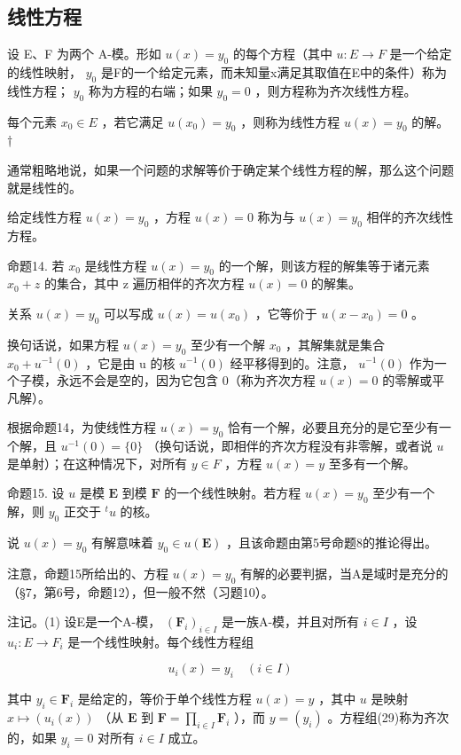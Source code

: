 \subsection{线性方程}

设 E、F 为两个 A-模。形如 \(u(x) = y_{0}\) 的每个方程（其中 \(u: E \to F\) 是一个给定的线性映射， \(y_{0}\) 是F的一个给定元素，而未知量x满足其取值在E中的条件）称为线性方程； \(y_{0}\) 称为方程的右端；如果 \(y_{0} = 0\) ，则方程称为齐次线性方程。

每个元素 \(x_{0} \in E\) ，若它满足 \(u(x_{0}) = y_{0}\) ，则称为线性方程 \(u(x) = y_{0}\) 的解。†

通常粗略地说，如果一个问题的求解等价于确定某个线性方程的解，那么这个问题就是线性的。

给定线性方程 \(u(x) = y_{0}\) ，方程 \(u(x) = 0\) 称为与 \(u(x) = y_{0}\) 相伴的齐次线性方程。

命题14. 若 \(x_{0}\) 是线性方程 \(u(x) = y_{0}\) 的一个解，则该方程的解集等于诸元素 \(x_{0} + z\) 的集合，其中 z 遍历相伴的齐次方程 \(u(x) = 0\) 的解集。

关系 \(u(x) = y_0\) 可以写成 \(u(x) = u(x_0)\) ，它等价于 \(u(x - x_0) = 0\) 。

换句话说，如果方程 \(u(x) = y_{0}\) 至少有一个解 \(x_{0}\) ，其解集就是集合 \(x_{0} + u^{-1}(0)\) ，它是由 u 的核 \(u^{-1}(0)\) 经平移得到的。注意， \(u^{-1}(0)\) 作为一个子模，永远不会是空的，因为它包含 0（称为齐次方程 \(u(x) = 0\) 的零解或平凡解）。

根据命题14，为使线性方程 \(u(x) = y_0\) 恰有一个解，必要且充分的是它至少有一个解，且 \(u^{-1}(0) = \{0\}\) （换句话说，即相伴的齐次方程没有非零解，或者说 \(u\) 是单射）；在这种情况下，对所有 \(y \in F\) ，方程 \(u(x) = y\) 至多有一个解。

命题15. 设 \(u\) 是模 \(\mathbf{E}\) 到模 \(\mathbf{F}\) 的一个线性映射。若方程 \(u(x) = y_0\) 至少有一个解，则 \(y_0\) 正交于 \(^t u\) 的核。

说 \(u(x) = y_{0}\) 有解意味着 \(y_{0} \in u(\mathbf{E})\) ，且该命题由第5号命题8的推论得出。

注意，命题15所给出的、方程 \(u(x) = y_{0}\) 有解的必要判据，当A是域时是充分的（§7，第6号，命题12），但一般不然（习题10）。

注记。(1) 设E是一个A-模， \((\mathbf{F}_{i})_{i\in I}\) 是一族A-模，并且对所有 \(i\in I\) ，设 \(u_{i}:E\to F_{i}\) 是一个线性映射。每个线性方程组

\[
u _ {i} (x) = y _ {i} \quad (i \in I)\tag{29}
\]

其中 \(y_{i} \in \mathbf{F}_{i}\) 是给定的，等价于单个线性方程 \(u(x) = y\) ，其中 \(u\) 是映射 \(x \mapsto (u_{i}(x))\) （从 \(\mathbf{E}\) 到 \(\mathbf{F} = \prod_{i \in I} \mathbf{F}_{i}\) ），而 \(y = (y_{i})\) 。方程组(29)称为齐次的，如果 \(y_{i} = 0\) 对所有 \(i \in I\) 成立。

